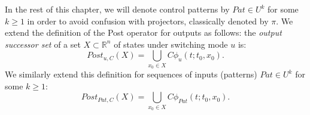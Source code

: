
In the rest of this chapter, we will denote control patterns by $Pat \in U^k$
for some $k \geq 1$ in order to avoid confusion with projectors, classically denoted by $\pi$.
We extend the definition of the Post operator for outputs as follows:
the {\em output successor set} of a set $X\subset \mathbb{R}^{n}$
of states under switching mode $u$ is:
$$Post_{u,C} (X) = \bigcup_{x_0 \in X} C \phi_u(t; t_0, x_0).$$
We similarly extend this definition for sequences of inputs (patterns) 
$Pat \in U^k$ for some $k \geq 1$:
$$Post_{Pat,C} (X) = \bigcup_{x_0 \in X} C \phi_{Pat}(t; t_0, x_0).$$


% 

